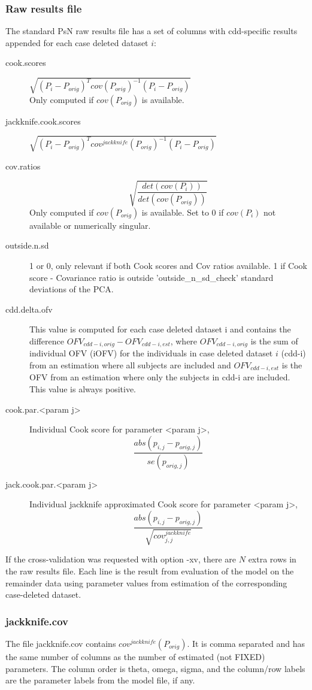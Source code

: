 \subsubsection*{Raw results file}
The standard PsN raw results file has a set of columns with cdd-specific results appended
for each case deleted dataset $i$:
\begin{description}
\item[cook.scores] $\sqrt{\left(P_{i}-P_{orig}\right)^Tcov(P_{orig})^{-1}\left(P_{i}-P_{orig}\right)}$\\
Only computed if $cov(P_{orig})$ is available.
\item[jackknife.cook.scores] $\sqrt{\left(P_{i}-P_{orig}\right)^Tcov^{jackknife}(P_{orig})^{-1}\left(P_{i}-P_{orig}\right)}$
\item[cov.ratios] \[\sqrt{\frac{det(cov(P_{i}))}{det(cov(P_{orig}))}}\]
Only computed if $cov(P_{orig})$ is available.
Set to 0 if $cov(P_{i})$ not available or numerically singular.
\item[outside.n.sd] 1 or 0, only relevant if both Cook scores and Cov ratios available.
1 if Cook score - Covariance ratio is outside 'outside\_n\_sd\_check' standard deviations of the PCA. 
\item[cdd.delta.ofv] This value is computed for each case deleted dataset i and
contains the difference $OFV_{cdd-i,orig} - OFV_{cdd-i,est}$,
where $OFV_{cdd-i,orig}$ is the sum of individual OFV (iOFV) for the individuals in case deleted dataset $i$ (cdd-i) 
from an estimation where all subjects are included and
$OFV_{cdd-i,est}$ is the OFV from an estimation where only the subjects in cdd-i are included. 
This value is always positive.
\item[cook.par.<param j>] Individual Cook score for parameter <param j>,
\[\frac{abs\left(p_{i,j}-p_{orig,j}\right)}{se(p_{orig,j})} \]
\item[jack.cook.par.<param j>] Individual jackknife approximated Cook score for parameter <param j>,
\[\frac{abs\left(p_{i,j}-p_{orig,j}\right)}{\sqrt{cov^{jackknife}_{j,j}}}\]
\end{description}

If the cross-validation was requested with option -xv, there are $N$ extra rows in the raw results file.
Each line is the result from evaluation of the model on the remainder data using parameter values from
estimation of the corresponding case-deleted dataset.

\subsubsection*{jackknife.cov}
The file jackknife.cov contains $cov^{jackknife}(P_{orig})$. It is comma separated and has the same number of columns
as the number of estimated (not FIXED) parameters. The column order is theta, omega, sigma, and the
column/row labels are the parameter labels from the model file, if any.

